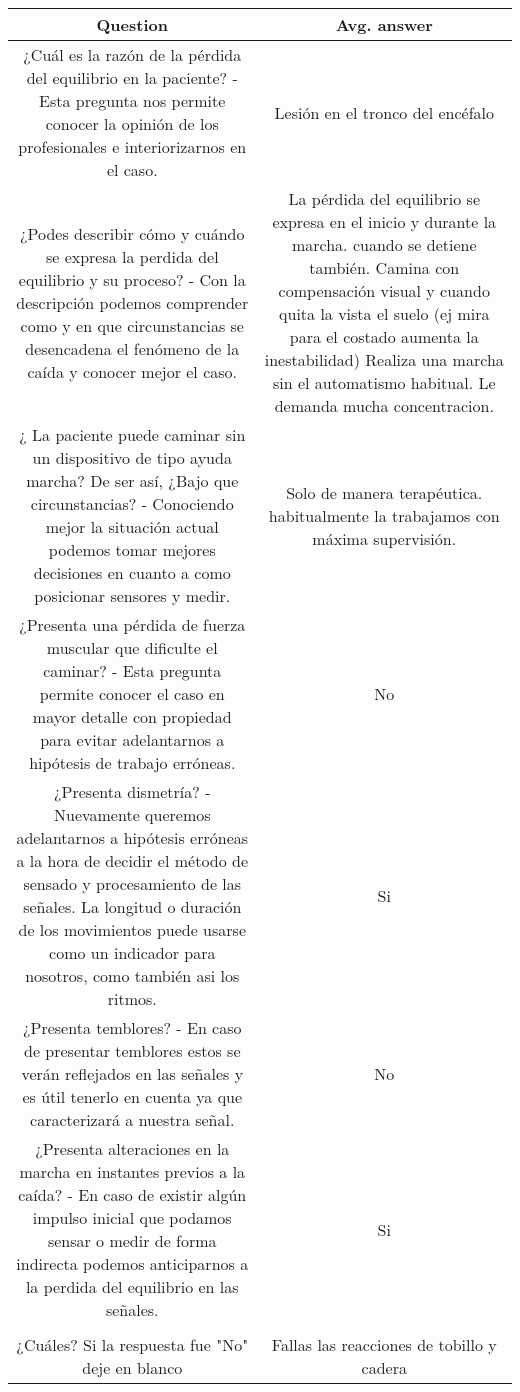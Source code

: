 \documentclass[conference]{IEEEtran}
\begin{document}
\begin{table*}[t]
\begin{center}
\begin{tabular}[!t]{|c|c|}
\hline
Question & Avg. answer \\
\hline
¿Cuál es la razón de la pérdida del equilibrio en la paciente? - Esta pregunta nos permite conocer la opinión de los profesionales e interiorizarnos en el caso.  & Lesión en el tronco del encéfalo\\
\hline
¿Podes describir cómo y cuándo se expresa la perdida del equilibrio y su proceso? - Con la descripción podemos comprender como y en que circunstancias se desencadena el fenómeno de la caída y conocer mejor el caso. &  La pérdida del equilibrio se expresa en el inicio y durante la marcha. cuando se detiene también. Camina con compensación visual y cuando quita la vista el suelo (ej mira para el costado aumenta la inestabilidad) Realiza una marcha sin el automatismo habitual. Le demanda mucha concentracion.  \\
\hline
¿ La paciente puede caminar sin un dispositivo de tipo ayuda marcha? De ser así, ¿Bajo que circunstancias? - Conociendo mejor la situación actual podemos tomar mejores decisiones en cuanto a como posicionar sensores y medir.  & Solo de manera  terapéutica. habitualmente la trabajamos con máxima supervisión.\\
\hline
¿Presenta una pérdida de fuerza muscular que dificulte el caminar? - Esta pregunta permite conocer el caso en mayor detalle  con propiedad para evitar adelantarnos a hipótesis de trabajo erróneas. & No \\
\hline
¿Presenta dismetría? - Nuevamente queremos adelantarnos a hipótesis erróneas a la hora de decidir el método de sensado y procesamiento de las señales. La longitud o duración de los movimientos puede usarse como un indicador para nosotros, como también asi los ritmos. & Si \\
\hline
¿Presenta temblores?  - En caso de presentar temblores estos se verán reflejados en las señales y es útil tenerlo en cuenta ya que caracterizará a nuestra señal. & No \\
\hline
¿Presenta alteraciones en la marcha en instantes previos a la caída? - En caso de existir algún impulso inicial que podamos sensar o medir de forma indirecta podemos anticiparnos a la perdida del equilibrio en las señales. & Si \\
\hline\\
¿Cuáles? Si la respuesta fue "No" deje en blanco & Fallas las reacciones de tobillo y cadera \\

\end{tabular}
\end{center}
\end{table*}
\end{document}
